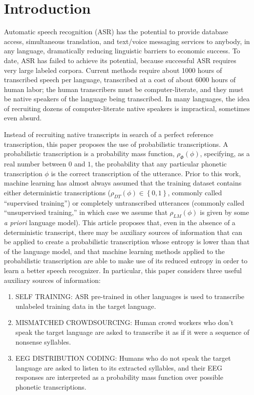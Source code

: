 \section{Introduction}

Automatic speech recognition (ASR) has the potential to provide
database access, simultaneous translation, and text/voice messaging
services to anybody, in any language, dramatically reducing linguistic
barriers to economic success.  To date, ASR has failed to achieve its
potential, because successful ASR requires very large labeled
corpora. Current methods require about 1000 hours of transcribed
speech per language, transcribed at a cost of about 6000 hours of
human labor; the human transcribers must be computer-literate, and
they must be native speakers of the language being transcribed.  In
many languages, the idea of recruiting dozens of computer-literate
native speakers is impractical, sometimes even absurd.

Instead of recruiting native transcripts in search of a perfect
reference transcription, this paper proposes the use of probabilistic
transcriptions.  A probabilistic transcription is a probability mass
function, $\rho_\Phi(\phi)$, specifying, as a real number between $0$ and
$1$, the probability that any particular phonetic transcription $\phi$
is the correct transcription of the utterance.  Prior to this work,
machine learning has almost always assumed that the training dataset
contains either deterministic transcriptions
($\rho_{DT}(\phi)\in\left\{0,1\right\}$, commonly called ``supervised
training'') or completely untranscribed utterances (commonly called
``unsupervised training,'' in which case we assume that $\rho_{LM}(\phi)$
is given by some {\em a priori} language model).  This article
proposes that, even in the absence of a deterministic transcript,
there may be auxiliary sources of information that can be applied to
create a probabilistic transcription whose entropy is lower than that
of the language model, and that machine learning methods applied to
the probabilistic transcription are able to make use of its reduced
entropy in order to learn a better speech recognizer.  In particular,
this paper considers three useful auxiliary sources of information:
\begin{enumerate}
\item SELF TRAINING: ASR pre-trained in other languages is used to
  transcribe unlabeled training data in the target language.
\item MISMATCHED CROWDSOURCING: Human crowd workers who don't speak
  the target language are asked to transcribe it as if it were a
  sequence of nonsense syllables.
\item EEG DISTRIBUTION CODING: Humans who do not speak the target
  language are asked to listen to its extracted syllables, and their
  EEG responses are interpreted as a probability mass function over
  possible phonetic transcriptions.
\end{enumerate}

